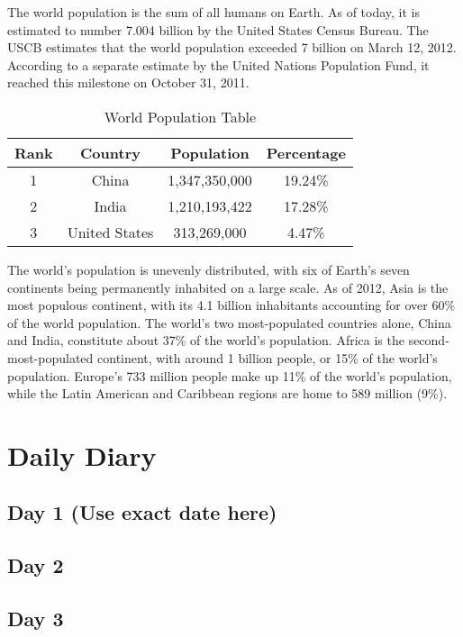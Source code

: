 \documentclass{fisattraining}
\begin{document}
The world population is the sum of all humans on Earth. As of today, it is estimated to number 7.004 billion by the United States Census Bureau. The USCB estimates that the world population exceeded 7 billion on March 12, 2012. According to a separate estimate by the United Nations Population Fund, it reached this milestone on October 31, 2011.
\begin{table}[h!]
\begin{center}
\begin{tabular}{|c|c|c|c|}
\hline Rank & Country & Population  & Percentage  \\ 
\hline 1 & China & 1,347,350,000 & 19.24\% \\ 
\hline 2 & India & 1,210,193,422  & 17.28\% \\ 
\hline 3 & United States & 313,269,000 & 4.47\% \\ 
\hline 
\end{tabular}
\caption{World Population Table} 
\end{center}
\end{table}
The world's population is unevenly distributed, with six of Earth's seven continents being permanently inhabited on a large scale. As of 2012, Asia is the most populous continent, with its 4.1 billion inhabitants accounting for over 60\% of the world population. The world's two most-populated countries alone, China and India, constitute about 37\% of the world's population. Africa is the second-most-populated continent, with around 1 billion people, or 15\% of the world's population. Europe's 733 million people make up 11\% of the world's population, while the Latin American and Caribbean regions are home to 589 million (9\%).


\chapter{Daily Diary}


\section{Day 1 (Use exact date here)}

\section{Day 2}

\section{Day 3}
\end{document}
